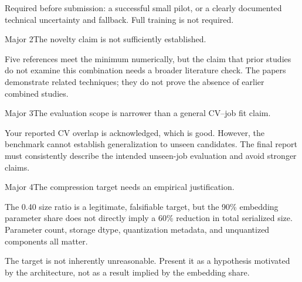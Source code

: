 Required before submission: a successful small pilot, or a clearly documented technical uncertainty and fallback. Full training is not required.

Major 2The novelty claim is not sufficiently established.

Five references meet the minimum numerically, but the claim that prior studies do not examine this combination needs a broader literature check. The papers demonstrate related techniques; they do not prove the absence of earlier combined studies.

Major 3The evaluation scope is narrower than a general CV–job fit claim.

Your reported CV overlap is acknowledged, which is good. However, the benchmark cannot establish generalization to unseen candidates. The final report must consistently describe the intended unseen-job evaluation and avoid stronger claims.

Major 4The compression target needs an empirical justification.

The 0.40 size ratio is a legitimate, falsifiable target, but the 90\% embedding parameter share does not directly imply a 60\% reduction in total serialized size. Parameter count, storage dtype, quantization metadata, and unquantized components all matter.

The target is not inherently unreasonable. Present it as a hypothesis motivated by the architecture, not as a result implied by the embedding share.

